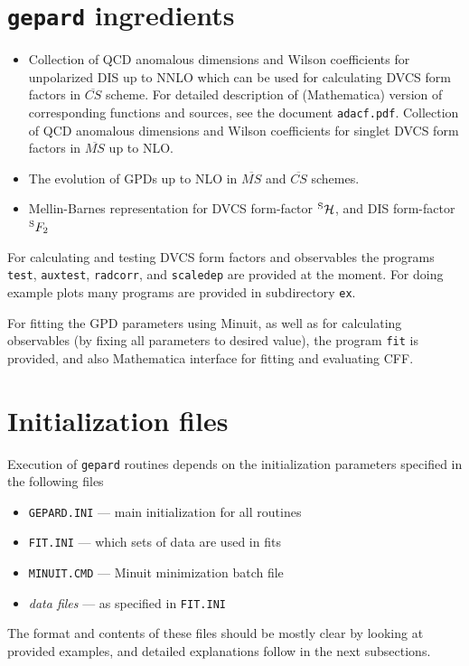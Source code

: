 \documentclass[12pt]{article}
\begin{document}
\section{\texttt{gepard} ingredients}

\begin{itemize}
\item Collection of QCD anomalous dimensions and Wilson coefficients for
unpolarized DIS up to NNLO which can be used for calculating DVCS form factors
in $\overline{CS}$ scheme. For detailed description of (Mathematica) version of
corresponding functions and sources, see the document \texttt{adacf.pdf}.
Collection of QCD anomalous dimensions and Wilson coefficients for singlet DVCS form factors
in $\overline{MS}$ up to NLO.

\item
The evolution of GPDs up to NLO in $\overline{MS}$ and  $\overline{CS}$ schemes.

\item 
Mellin-Barnes representation for DVCS form-factor ${ }^{\rm S}\mathcal{H}$, and
DIS form-factor ${}^{\rm S}F_2$
\end{itemize}

For calculating and testing DVCS form factors and observables the programs \texttt{test},
\texttt{auxtest}, \texttt{radcorr}, and \texttt{scaledep} are provided at the
moment. For doing example plots many programs are provided in subdirectory \texttt{ex}.

For fitting the GPD parameters using Minuit, as well as for calculating observables (by
fixing all parameters to desired value), the program \texttt{fit} is provided, and
also Mathematica interface for fitting and evaluating CFF.

\section{Initialization files}
\label{sec:init}

Execution of \texttt{gepard} routines depends on the initialization parameters specified in
the following files
\begin{itemize}
\item  \texttt{GEPARD.INI} --- main initialization for all routines
\item  \texttt{FIT.INI} --- which sets of data are used in fits
\item \texttt{MINUIT.CMD} --- Minuit minimization batch file
\item \emph{data files} --- as specified in \texttt{FIT.INI}
\end{itemize}
The format and contents of these files should be mostly clear by looking at provided
examples, and detailed explanations follow in the next subsections.
\end{document}
